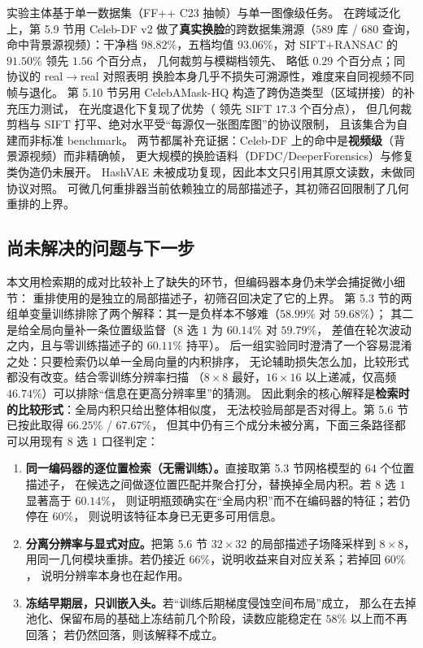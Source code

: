 实验主体基于单一数据集（FF++ C23 抽帧）与单一图像级任务。
在跨域泛化上，第 5.9 节用 Celeb-DF v2 做了\textbf{真实换脸}的跨数据集溯源（$589$ 库 / $680$ 查询，
命中背景源视频）：干净档 $98.82\%$，五档均值 $93.06\%$，对 SIFT$+$RANSAC 的 $91.50\%$ 领先 $1.56$ 个百分点，
几何裁剪与模糊档领先、 略低 $0.29$ 个百分点；同协议的 real$\rightarrow$real 对照表明
换脸本身几乎不损失可溯源性，难度来自同视频不同帧与退化。
第 5.10 节另用 CelebAMask-HQ 构造了跨伪造类型（区域拼接）的补充压力测试，
在光度退化下复现了优势（ 领先 SIFT $17.3$ 个百分点），
但几何裁剪档与 SIFT 打平、绝对水平受“每源仅一张图库图”的协议限制，
且该集合为自建而非标准 benchmark。
两节都属补充证据：Celeb-DF 上的命中是\textbf{视频级}（背景源视频）而非精确帧，
更大规模的换脸语料（DFDC$/$DeeperForensics）与修复类伪造仍未展开。
HashVAE 未被成功复现，因此本文只引用其原文读数，未做同协议对照。
可微几何重排器当前依赖独立的局部描述子，其初筛召回限制了几何重排的上界。

\subsection{尚未解决的问题与下一步}

本文用检索期的成对比较补上了缺失的环节，但编码器本身仍未学会捕捉微小细节：
重排使用的是独立的局部描述子，初筛召回决定了它的上界。
第 5.3 节的两组单变量训练排除了两个解释：其一是负样本不够难（$58.99\%$ 对 $59.68\%$）；
其二是给全局向量补一条位置级监督（$8$ 选 $1$ 为 $60.14\%$ 对 $59.79\%$，
差值在轮次波动之内，且与零训练描述子的 $60.11\%$ 持平）。
后一组实验同时澄清了一个容易混淆之处：只要检索仍以单一全局向量的内积排序，
无论辅助损失怎么加，比较形式都没有改变。结合零训练分辨率扫描
（$8\times8$ 最好，$16\times16$ 以上递减，仅高频 $46.74\%$）可以排除“信息在更高分辨率里”的猜测。
因此剩余的核心解释是\textbf{检索时的比较形式}：全局内积只给出整体相似度，
无法校验局部是否对得上。第 5.6 节已按此取得 $66.25\%$ / $67.67\%$，
但其中仍有三个成分未被分离，下面三条路径都可以用现有 $8$ 选 $1$ 口径判定：

\begin{enumerate}[leftmargin=1.6em,itemsep=1pt]
\item \textbf{同一编码器的逐位置检索（无需训练）。}直接取第 5.3 节网格模型的 $64$ 个位置描述子，
      在候选之间做逐位置匹配并聚合打分，替换掉全局内积。若 $8$ 选 $1$ 显著高于 $60.14\%$，
      则证明瓶颈确实在“全局内积”而不在编码器的特征；若仍停在 $60\%$，
      则说明该特征本身已无更多可用信息。
\item \textbf{分离分辨率与显式对应。}把第 5.6 节 $32\times32$ 的局部描述子场降采样到 $8\times8$，
      用同一几何模块重排。若仍接近 $66\%$，说明收益来自对应关系；若掉回 $60\%$，
      说明分辨率本身也在起作用。
\item \textbf{冻结早期层，只训嵌入头。}若“训练后期梯度侵蚀空间布局”成立，
      那么在去掉池化、保留布局的基础上冻结前几个阶段，读数应能稳定在 $58\%$ 以上而不再回落；
      若仍然回落，则该解释不成立。
\end{enumerate}

